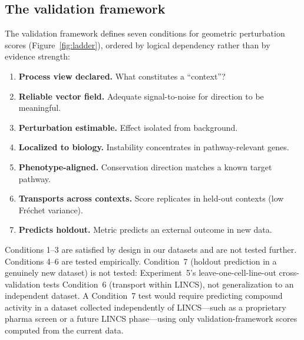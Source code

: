 \documentclass[11pt]{article}
\begin{document}
\subsection{The validation framework}

The validation framework defines seven conditions for geometric
perturbation scores (Figure~\ref{fig:ladder}), ordered by logical
dependency rather than by evidence strength:

\begin{enumerate}
  \item \textbf{Process view declared.} What constitutes a ``context''?
  \item \textbf{Reliable vector field.} Adequate signal-to-noise for
    direction to be meaningful.
  \item \textbf{Perturbation estimable.} Effect isolated from background.
  \item \textbf{Localized to biology.} Instability concentrates in
    pathway-relevant genes.
  \item \textbf{Phenotype-aligned.} Conservation direction matches a
    known target pathway.
  \item \textbf{Transports across contexts.} Score replicates in held-out
    contexts (low Fr\'echet variance).
  \item \textbf{Predicts holdout.} Metric predicts an external outcome
    in new data.
\end{enumerate}

Conditions 1--3 are satisfied by design in our datasets and are not tested
further. Conditions 4--6 are tested empirically.
Condition~7 (holdout prediction in a genuinely new dataset) is not tested:
Experiment~5's leave-one-cell-line-out cross-validation tests Condition~6
(transport within LINCS), not generalization to an independent dataset.
A Condition~7 test would require predicting compound activity in a dataset
collected independently of LINCS---such as a proprietary pharma screen
or a future LINCS phase---using only validation-framework scores computed
from the current data.
\end{document}
